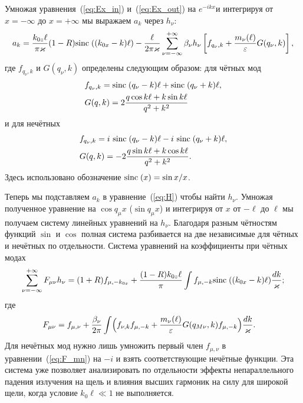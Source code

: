 Умножая уравнения~(\ref{eq:Ex_in}) и~(\ref{eq:Ex_out}) на $e^{-ikx}$и интегрируя от $x = -\infty$ до $x = +\infty$  
мы выражаем $a_k$ через $h_\nu$:
\begin{align}
a_k = \frac{k_{0z}\ell }{\pi \varkappa} (1-R)\mathrm{sinc}\;((k_{0x}-k)\ell) 
        - \frac{\ell}{2 \pi \varkappa}\sum_{\nu = -\infty}^{+\infty} \beta_\nu h_\nu\left[f_{q_\nu,k}
+ \frac{m_\nu(\ell)}{\varepsilon}G(q_\nu,k)\right],
\end{align}
где $f_{q_\nu,k}$ и $G(q_\nu,k)$ определены следующим образом:  для чётных мод
\begin{align*}
&f_{q_\nu,k} =
\mathrm{sinc}\;(q_\nu-k)\ell + \mathrm{sinc}\;(q_\nu+k)\ell,\\
&G(q,k) = 2\frac{q\cos{k\ell}+k\sin{k\ell}}{q^2 + k^2}\\
\end{align*}
и для нечётных
\begin{align}
&f_{q_\nu,k} = i\ \sinc(q_\nu-k)\ell - i\ \sinc(q_\nu+k)\ell,\nonumber\\
& G(q,k) = -2\frac{q\sin{k\ell}+k\cos{k\ell}}{q^2 + k^2}.
\end{align}
Здесь использовано обозначение  $\mathrm{sinc}\;(x) = {\sin{x}}/{x}$.

Теперь мы подставляем $a_k$ в уравнение~(\ref{eq:H}) чтобы найти $h_\nu$. Умножая полученное уравнение на  $\cos{q_\mu x}$ ($\sin{q_\mu x}$) 
и интегрируя от $x$ от $-\ell$ до $\ell$ мы получаем систему линейных уравнений на $h_\nu$. Благодаря разным чётностям функций $\sin$ и $\cos$  полная система
разбивается на две независимые для чётных и нечётных по отдельности. Система уравнений на коэффициенты при чётных модах 
\begin{align}
	\sum_{\nu=-\infty}^{+\infty} F_{\mu \nu} h_\nu = (1+R)f_{\mu,-k_{0x}} + \frac{(1-R)k_{0z} \ell}{\pi}\int f_{\mu,-k}\mathrm{sinc}\;((k_{0x}-k)\ell) \frac{dk}{\varkappa}; \label{eq:General_System}
\end{align}
где 
\begin{align}
F_{\mu \nu} &= f_{\mu,\nu} + \frac{\beta_\nu}{2\pi}\int
\Bigl(f_{\nu,k}f_{\mu,-k}  + \frac{m_\nu(\ell)}{\varepsilon} G(q_{M\nu},k)f_{\mu,-k} \Bigr)\frac{dk}{\varkappa}.
\label{eq:F_mn}
\end{align}
Для нечётных мод нужно лишь умножить первый член $f_{\mu,\nu}$ в уравнении~(\ref{eq:F_mn}) на $-i$ и взять соответствующие нечётные функции. Эта система уже позволяет анализировать по отдельности эффекты непараллельного падения излучения на щель и влияния высших гармоник на силу
для широкой щели, когда условие $k_0 \ell \ll 1$ не выполняется.

